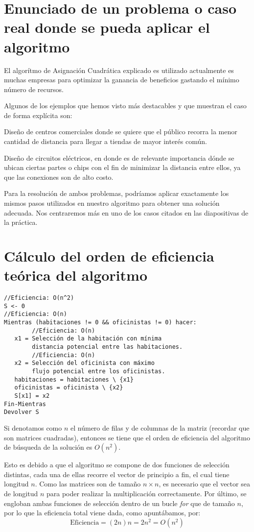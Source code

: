 \documentclass[11pt, a4paper]{article}
\theoremstyle{theorem-style}
\theoremstyle{definition-style}
\theoremstyle{remark-style}
\theoremstyle{example-style}
\begin{document}
\section{Enunciado de un problema o caso real donde se pueda aplicar el algoritmo}

El algorítmo de Asignación Cuadrática explicado es utilizado actualmente es muchas empresas para optimizar la ganancia de beneficios gastando el mínimo número de recursos.

Algunos de los ejemplos que hemos visto más destacables y que muestran el caso de forma explícita son:

Diseño de centros comerciales donde se quiere que el público recorra
la menor cantidad de distancia para llegar a tiendas de mayor interés común. 

Diseño de circuitos eléctricos, en donde es de relevante importancia
dónde se ubican ciertas partes o chips con el fin de minimizar la
distancia entre ellos, ya que las conexiones son de alto costo.

Para la resolución de ambos problemas, podríamos aplicar exactamente los mismos pasos utilizados en nuestro algoritmo para obtener una solución adecuada. Nos centraremos más en uno de los casos citados en las diapositivas de la práctica.

\section{Cálculo del orden de eficiencia teórica del algoritmo }
\begin{verbatim}
//Eficiencia: O(n^2)
S <- 0
//Eficiencia: O(n)
Mientras (habitaciones != 0 && oficinistas != 0) hacer:
        //Eficiencia: O(n)
   x1 = Selección de la habitación con mínima 
        distancia potencial entre las habitaciones.
        //Eficiencia: O(n)
   x2 = Selección del oficinista con máximo 
        flujo potencial entre los oficinistas.
   habitaciones = habitaciones \ {x1}
   oficinistas = oficinista \ {x2}
   S[x1] = x2
Fin-Mientras
Devolver S
\end{verbatim}
Si denotamos como $n$ el número de filas y de columnas de la matriz (recordar que son matrices cuadradas), entonces se tiene que el orden de eficiencia del algoritmo de búsqueda de la solución es $O(n^2)$.

Esto es debido a que el algoritmo se compone de dos funciones de selección distintas, cada una de ellas recorre el vector de principio a fin, el cual tiene longitud $n$.  Como las matrices son de tamaño $n\times n$, es necesario que el vector sea de longitud $n$ para poder realizar la multiplicación correctamente. Por último, se engloban ambas funciones de selección dentro de un bucle \textit{for} que de tamaño $n$, por lo que la eficiencia total viene dada, como apuntábamos, por:
$$\textrm{Eficiencia}= (2n)n=2n^2=O(n^2)$$
\end{document}
